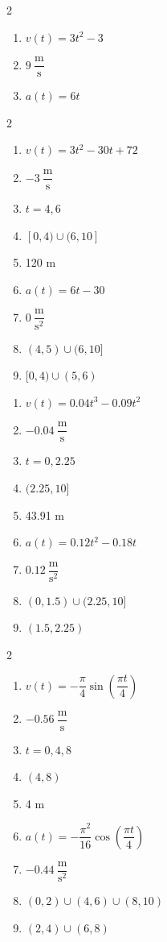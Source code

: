\documentclass{book}
\newcommand{\mpers}{\dfrac{\text{m}}{\text{s}}}
\newcommand{\mperss}{\dfrac{\text{m}}{\text{s}^2}}
\begin{document}
\begin{appendices}
\begin{enumerate}[!HW!]
\begin{multicols}{2}
\begin{enumerate}
\item $v(t) = 3t^2-3$
\item $9\ \mpers$
\item $a(t)=6t$
\end{enumerate}
\end{multicols}
\begin{multicols}{2}
\itemspade \mbox{}\vspace{-22pt}

\begin{enumerate}
\item $v(t)=3t^2-30t+72$
\item $-3\ \mpers$
\item  $t=4,6$
\item $[0,4)\cup (6,10]$
\item 120 m
\item $a(t)=6t-30$
\item $0\ \mperss$
\item $(4,5)\cup (6,10]$
\item $[0,4)\cup (5,6)$
\end{enumerate}\columnbreak

\itemspade \mbox{}\vspace{-22pt}

\begin{enumerate}
\item $v(t)=0.04t^3-0.09t^2$
\item $-0.04\ \mpers$
\item  $t=0, 2.25$
\item $(2.25,10]$
\item 43.91 m
\item $a(t)=0.12t^2-0.18t$
\item $0.12\ \mperss$
\item $(0,1.5)\cup (2.25,10]$
\item $(1.5,2.25)$
\end{enumerate}
\end{multicols}
\begin{multicols}{2}
\itemspade \mbox{}\vspace{-22pt}

\begin{enumerate}
\item $v(t)=-\dfrac{\pi}{4}\sin\left(\dfrac{\pi t}{4}\right)$
\item $-0.56\ \mpers$
\item  $t=0, 4, 8$
\item $(4,8)$
\item 4 m
\item $a(t)=-\dfrac{\pi^2}{16}\cos\left(\dfrac{\pi t}{4}\right)$
\item $-0.44\ \mperss$
\item $(0,2)\cup (4,6)\cup(8,10)$
\item $(2,4)\cup(6,8)$
\end{enumerate}
\columnbreak


\end{multicols}
\end{enumerate}
\end{appendices}
\end{document}
